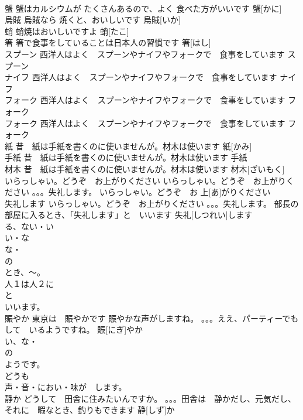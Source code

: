 \documentclass[8pt]{extreport}
\begin{document}
\begin{CJK}{UTF8}{min}
\\	蟹	蟹はカルシウムが たくさんあるので、よく 食べた方がいいです	蟹[かに]			
\\	烏賊	烏賊なら 焼くと、おいしいです	烏賊[いか]			
\\	蛸	蛸焼はおいしいですよ	蛸[たこ]			
\\	箸	箸で食事をしていることは日本人の習慣です	箸[はし]					
\\	スプーン	西洋人はよく　スプーンやナイフやフォークで　食事をしています	スプーン						
\\	ナイフ	西洋人はよく　スプーンやナイフやフォークで　食事をしています	ナイフ						
\\	フォーク	西洋人はよく　スプーンやナイフやフォークで　食事をしています	フォーク						
\\	フォーク	西洋人はよく　スプーンやナイフやフォークで　食事をしています	フォーク						
\\	紙	昔　紙は手紙を書くのに使いませんが。材木は使います	紙[かみ]					
\\	手紙	昔　紙は手紙を書くのに使いませんが。材木は使います	手紙					
\\	材木	昔　紙は手紙を書くのに使いませんが。材木は使います	材木[ざいもく]			
\\	いらっしゃい。どうぞ　お上がりください	いらっしゃい。どうぞ　お上がりください 。。。失礼します。	いらっしゃい。どうぞ　お 上[あ]がりください			
\\	失礼します	いらっしゃい。どうぞ　お上がりください 。。。失礼します。 部長の部屋に入るとき、「失礼します」と　いいます	失礼[しつれい]します			
\\	る、ない・い
\\	い・な
\\	な・
\\	の
\\	とき、～。
\\	人１は人２に
\\	と　
\\	いいます。
\\	賑やか	東京は　賑やかです 賑やかな声がしますね。 。。。ええ、パーティーでも　して　いるようですね。	賑[にぎ]やか				
\\	い、な・
\\	の
\\	ようです。
\\	どうも
\\	声・音・におい・味が　します。
\\	静か	どうして　田舎に住みたいんですか。 。。。田舎は　静かだし、元気だし、それに　暇なとき、釣りもできます	静[しず]か			

\end{CJK}
\end{document}
